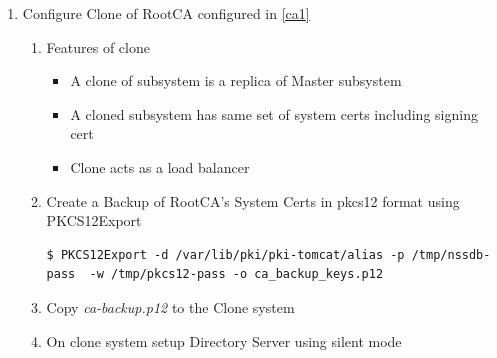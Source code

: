 \documentclass[a4paper]{article}
\begin{document}
\begin{enumerate}[label*=\arabic*.]
\begin{enumerate}[label*=\arabic*.]
\begin{lstlisting}
[Tomcat]
pki_ajp_port=30009
pki_tomcat_server_port=30005


[CA]
pki_external=True
pki_external_ca_cert_chain_path=/tmp/ca_cert_chain.cert
pki_external_ca_cert_path=/tmp/ca_signing.cert
pki_external_step_two=True
pki_ca_signing_subject_dn=cn=CA Signing Certificate,ou=External,o=example.org
pki_ds_hostname=pki1.example.org
pki_ds_ldap_port=2389
pki_ds_password=Secret123
pki_ds_secure_connection=False
                        \end{lstlisting}
                    \item Run pkispawn with above modified configuration file
                        \begin{lstlisting}[style=bashInputStyle]
$ pkispawn -s CA -f ca-ext.inf -vv 
                        \end{lstlisting}
                    \item Verify subsystem status using systemctl and pkidaemon commands
                    \begin{lstlisting}[style=bashInputStyle]
$ systemctl status pki-tomcatd@Example-ExtCA1
$ pkidaemon status tomcat Example1-ExtCA1
                    \end{lstlisting}
                \end{enumerate}
            \item \label{clone_rootca} Configure Clone of RootCA configured in \ref{ca1}
                \begin{enumerate}[label*=\arabic*.]
                    \item Features of clone
                        \begin{itemize}
                            \item A clone of subsystem is a replica of Master subsystem 
                            \item A cloned subsystem has same set of system certs including signing cert 
                            \item Clone acts as a load balancer
                        \end{itemize}
                    \item \label{pkcs12export} Create a Backup of RootCA's System Certs in pkcs12 format using PKCS12Export
                        \begin{lstlisting}[style=bashInputStyle]
$ PKCS12Export -d /var/lib/pki/pki-tomcat/alias -p /tmp/nssdb-pass  -w /tmp/pkcs12-pass -o ca_backup_keys.p12
                        \end{lstlisting}
                    \item Copy \textit{ca-backup.p12} to the Clone system
                    \item On clone system setup Directory Server using silent mode


\end{enumerate}
\end{enumerate}
\end{document}
